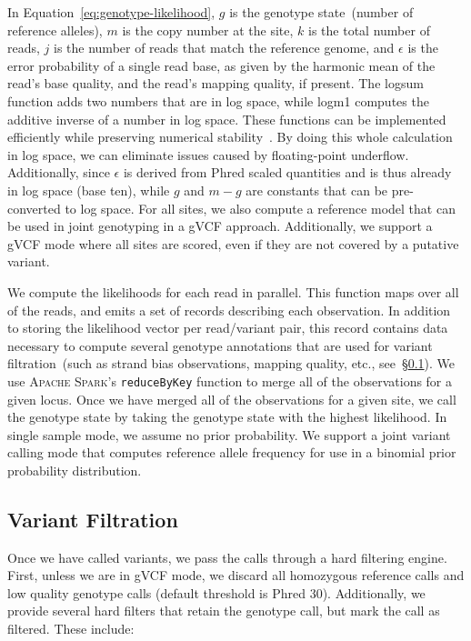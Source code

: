 \documentclass[phd]{ucbthesis}
\begin{document}
In Equation~\eqref{eq:genotype-likelihood}, $g$ is the genotype state~(number of
reference alleles), $m$ is the copy number at the site, $k$ is the total number of
reads, $j$ is the number of reads that match the reference genome, and $\epsilon$
is the error probability of a single read base, as given by the harmonic mean of the
read's base quality, and the read's mapping quality, if present. The logsum function
adds two numbers that are in log space, while logm1 computes the additive inverse of
a number in log space. These functions can be implemented efficiently while preserving
numerical stability~\cite{durbin98}. By doing this whole calculation in log space,
we can eliminate issues caused by floating-point underflow. Additionally, since
$\epsilon$ is derived from Phred scaled quantities and is thus already in log
space (base ten), while $g$ and $m - g$ are constants that can be pre-converted to
log space. For all sites, we also compute a reference model that can be used in
joint genotyping in a gVCF approach. Additionally, we support a gVCF mode where all
sites are scored, even if they are not covered by a putative variant.

We compute the likelihoods for each read in parallel. This function maps over all
of the reads, and emits a set of records describing each observation. In addition
to storing the likelihood vector per read/variant pair, this record contains data
necessary to compute several genotype annotations that are used for variant
filtration~(such as strand bias observations, mapping quality, etc.,
see~\S\ref{sec:variant-filtration}). We use \textsc{Apache Spark}'s
\texttt{reduceByKey} function to merge all of the observations for a given
locus. Once we have merged all of the observations for a given site, we call the
genotype state by taking the genotype state with the highest likelihood. In single
sample mode, we assume no prior probability. We support a joint variant calling
mode that computes reference allele frequency for use in a binomial prior
probability distribution.

\subsection{Variant Filtration}
\label{sec:variant-filtration}

Once we have called variants, we pass the calls through a hard filtering engine.
First, unless we are in gVCF mode, we discard all homozygous reference calls and
low quality genotype calls (default threshold is Phred 30). Additionally, we
provide several hard filters that retain the genotype call, but mark the call as
filtered. These include:
\end{document}
